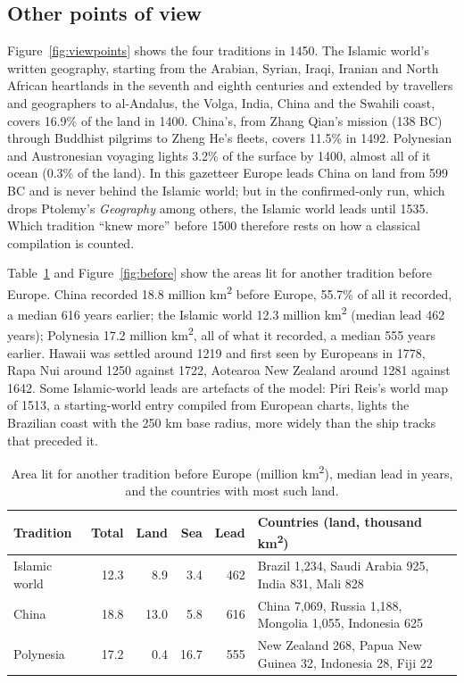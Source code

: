 \documentclass[11pt,a4paper]{article}
\begin{document}
\subsection{Other points of view}
Figure~\ref{fig:viewpoints} shows the four traditions in 1450. The Islamic world's written geography, starting from the Arabian, Syrian, Iraqi, Iranian and North African heartlands in the seventh and eighth centuries and extended by travellers and geographers to al-Andalus, the Volga, India, China and the Swahili coast, covers 16.9\% of the land in 1400. China's, from Zhang Qian's mission (138 BC) through Buddhist pilgrims to Zheng He's fleets, covers 11.5\% in 1492. Polynesian and Austronesian voyaging lights 3.2\% of the surface by 1400, almost all of it ocean (0.3\% of the land). In this gazetteer Europe leads China on land from 599 BC and is never behind the Islamic world; but in the confirmed-only run, which drops Ptolemy's \textit{Geography} among others, the Islamic world leads until 1535. Which tradition ``knew more'' before 1500 therefore rests on how a classical compilation is counted.

Table~\ref{tab:before} and Figure~\ref{fig:before} show the areas lit for another tradition before Europe. China recorded 18.8 million km\textsuperscript{2} before Europe, 55.7\% of all it recorded, a median 616 years earlier; the Islamic world 12.3 million km\textsuperscript{2} (median lead 462 years); Polynesia 17.2 million km\textsuperscript{2}, all of what it recorded, a median 555 years earlier. Hawaii was settled around 1219 and first seen by Europeans in 1778, Rapa Nui around 1250 against 1722, Aotearoa New Zealand around 1281 against 1642. Some Islamic-world leads are artefacts of the model: Piri Reis's world map of 1513, a starting-world entry compiled from European charts, lights the Brazilian coast with the 250 km base radius, more widely than the ship tracks that preceded it.

\begin{table}[tbp]\centering\small\caption{Area lit for another tradition before Europe (million km\textsuperscript{2}), median lead in years, and the countries with most such land.}\label{tab:before}\begin{tabular}{lrrrrp{6cm}}\toprule Tradition & Total & Land & Sea & Lead & Countries (land, thousand km\textsuperscript{2})\\\midrule
Islamic world & 12.3 & 8.9 & 3.4 & 462 & Brazil 1,234, Saudi Arabia 925, India 831, Mali 828\\
China & 18.8 & 13.0 & 5.8 & 616 & China 7,069, Russia 1,188, Mongolia 1,055, Indonesia 625\\
Polynesia & 17.2 & 0.4 & 16.7 & 555 & New Zealand 268, Papua New Guinea 32, Indonesia 28, Fiji 22\\
\bottomrule\end{tabular}\end{table}
\end{document}
